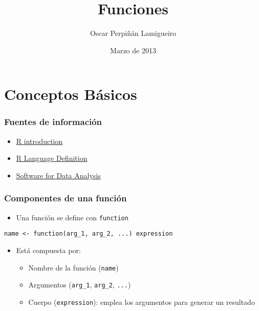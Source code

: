 \documentclass[xcolor={usenames,svgnames,dvipsnames}]{beamer}
\title{Funciones}
\author{Oscar Perpiñán Lamigueiro}
\date{Marzo de 2013}
\begin{document}
\maketitle



\section{Conceptos Básicos}
\label{sec-1}
\begin{frame}
\frametitle{Fuentes de información}
\label{sec-1-1}

\begin{itemize}
\item \href{http://cran.r-project.org/doc/manuals/R-intro.html}{R introduction}
\item \href{http://cran.r-project.org/doc/manuals/R-lang.html}{R Language Definition}
\item \href{http://books.google.es/books/about/Software_for_Data_Analysis.html}{Software for Data Analysis}
\end{itemize}
\end{frame}
\begin{frame}
\frametitle{Componentes de una función}
\label{sec-1-2}

\begin{itemize}
\item Una función se define con \texttt{function}
\end{itemize}
\begin{center}
\texttt{name <- function(arg\_1, arg\_2, ...) expression}
\end{center}

\begin{itemize}
\item Está compuesta por:
\begin{itemize}
\item Nombre de la función (\texttt{name})
\item Argumentos (\texttt{arg\_1}, \texttt{arg\_2}, \texttt{...})
\item Cuerpo (\texttt{expression}): emplea los argumentos para generar un resultado
\end{itemize}
\end{itemize}
\end{frame}
\end{document}
